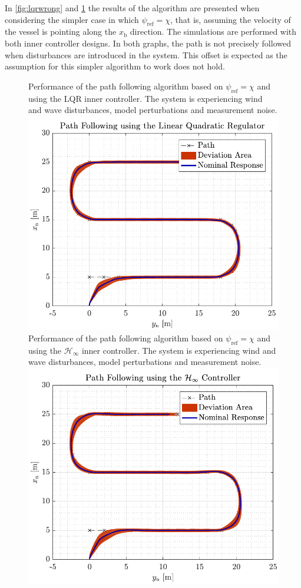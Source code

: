 In \autoref{fig:lqrwrong} and \ref{fig:robwrong} the results of the algorithm are presented when considering the simpler case in which $\psi_\mathrm{ref} = \chi$, that is, assuming the velocity of the vessel is pointing along the $x_\mathrm{b}$ direction. The simulations are performed with both inner controller designs. In both graphs, the path is not precisely followed when disturbances are introduced in the system. This offset is expected as the assumption for this simpler algorithm to work does not hold.
\begin{figure}[H]
	\captionbox  %
	{               %
	 		Performance of the path following algorithm based on $\psi_\mathrm{ref}=\chi$ and using the LQR inner controller. The system is experiencing wind and wave disturbances, model perturbations and measurement noise.\label{fig:lqrwrong}                                  %
	}                                                                 %
	{                                                                  %
		\includegraphics[width=.45\textwidth]{figures/path_lqr_no_correc}         %
	}                                                                    %
	\hspace{5pt}                                                          %
	\captionbox  %
	{       
		Performance of the path following algorithm based on $\psi_\mathrm{ref}=\chi$ and using the $\mathcal{H}_\infty$ inner controller. The system is experiencing wind and wave disturbances, model perturbations and measurement noise.                                       %
		\label{fig:robwrong}                                     %
	}                                                                           %
	{                                                                            %
		\includegraphics[width=.45\textwidth]{figures/path_rob_no_correc}            %
	}                                                                             %
\end{figure}
